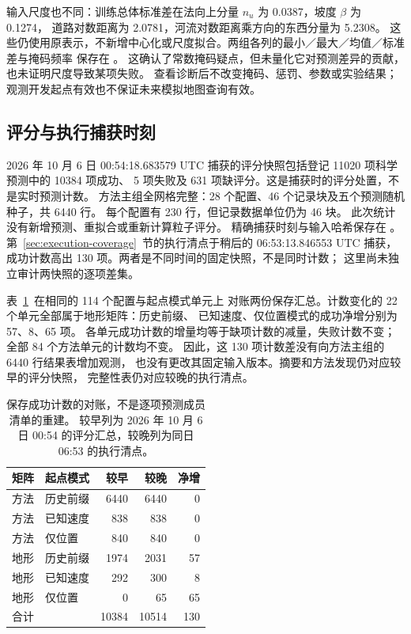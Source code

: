 \documentclass[UTF8,11pt]{ctexart}
\begin{document}
\noindent\parbox{\linewidth}{
输入尺度也不同：训练总体标准差在法向上分量 \(n_u\) 为 0.0387，坡度 \(\beta\) 为 0.1274，
道路对数距离为 2.0781，河流对数距离乘方向的东西分量为 5.2308。
这些仍使用原表示，不新增中心化或尺度拟合。两组各列的最小／最大／均值／标准差与掩码频率
保存在 。
这确认了常数掩码疑点，但未量化它对预测差异的贡献，也未证明尺度导致某项失败。
查看诊断后不改变掩码、惩罚、参数或实验结果；观测开发起点有效也不保证未来模拟地图查询有效。
}

\clearpage
\subsection{评分与执行捕获时刻}
\label{sec:score-execution-snapshots}
2026 年 10 月 6 日 00:54:18.683579 UTC 捕获的评分快照包括登记 11020 项科学预测中的 10384 项成功、
5 项失败及 631 项缺评分。这是捕获时的评分处置，不是实时预测计数。
方法主组全网格完整：28 个配置、46 个记录块及五个预测随机种子，共 6440 行。
每个配置有 230 行，但记录数据单位仍为 46 块。
此次统计没有新增预测、重拟合或重新计算粒子评分。
精确捕获时刻与输入哈希保存在
。
第~\ref{sec:execution-coverage}~节的执行清点于稍后的 06:53:13.846553 UTC 捕获，
成功计数高出 130 项。两者是不同时间的固定快照，不是同时计数；
这里尚未独立审计两快照的逐项差集。

表~\ref{tab:capture-count-difference}~在相同的 114 个配置与起点模式单元上
对账两份保存汇总。计数变化的 22 个单元全部属于地形矩阵：历史前缀、
已知速度、仅位置模式的成功净增分别为 57、8、65 项。
各单元成功计数的增量均等于缺项计数的减量，失败计数不变；
全部 84 个方法单元的计数均不变。
因此，这 130 项计数差没有向方法主组的 6440 行结果表增加观测，
也没有更改其固定输入版本。摘要和方法发现仍对应较早的评分快照，
完整性表仍对应较晚的执行清点。

\begin{table}[htbp]
\centering\small
\caption{保存成功计数的对账，不是逐项预测成员清单的重建。
较早列为 2026 年 10 月 6 日 00:54 的评分汇总，较晚列为同日 06:53 的执行清点。}
\label{tab:capture-count-difference}
\begin{tabular}{@{}llrrr@{}}
\toprule
矩阵 & 起点模式 & 较早 & 较晚 & 净增\\
\midrule
方法 & 历史前缀 & 6440 & 6440 & 0\\
方法 & 已知速度 & 838 & 838 & 0\\
方法 & 仅位置 & 840 & 840 & 0\\
地形 & 历史前缀 & 1974 & 2031 & 57\\
地形 & 已知速度 & 292 & 300 & 8\\
地形 & 仅位置 & 0 & 65 & 65\\
\midrule
合计 & & 10384 & 10514 & 130\\
\bottomrule
\end{tabular}
\end{table}
\end{document}
